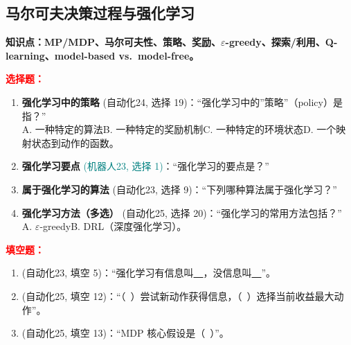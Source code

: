 ﻿\documentclass[../main.tex]{subfiles}
\begin{document}
\subsection{马尔可夫决策过程与强化学习}

\noindent\textbf{知识点：MP/MDP、马尔可夫性、策略、奖励、$\varepsilon$-greedy、探索/利用、Q-learning、model-based vs.\ model-free。}

\noindent\textbf{\textcolor{red}{选择题：}}
\begin{enumerate}[itemsep=0.45em, topsep=0.2em, leftmargin=1.5em]
    \item \textbf{强化学习中的策略} \textcolor{autoclassgreen}{(自动化24, 选择 19)}：``强化学习中的''策略''（policy）是指？''\\
    A. 一种特定的算法\quad B. 一种特定的奖励机制\quad C. 一种特定的环境状态\quad D. 一个映射状态到动作的函数。 

    \item \textbf{强化学习要点} \textcolor{teal}{(机器人23, 选择 1)}：``强化学习的要点是？''\\
     

    \item \textbf{属于强化学习的算法} \textcolor{autoclassgreen}{(自动化23, 选择 9)}：``下列哪种算法属于强化学习？''\\
     

    \item \textbf{强化学习方法（多选）} \textcolor{autoclassgreen}{(自动化25, 选择 20)}：``强化学习的常用方法包括？''\\
    A. $\varepsilon$-greedy\quad B. DRL（深度强化学习）\quad {}\quad {}。 
\end{enumerate}

\noindent\textbf{\textcolor{red}{填空题：}}
\begin{enumerate}[itemsep=0.3em, topsep=0.2em, leftmargin=1.5em]
    \item \textcolor{autoclassgreen}{(自动化23, 填空 5)}：``强化学习有信息叫\underline{\ \ }，没信息叫\underline{\ \ }''。 
    \item \textcolor{autoclassgreen}{(自动化25, 填空 12)}：``（\ ）尝试新动作获得信息，（\ ）选择当前收益最大动作''。 
    \item \textcolor{autoclassgreen}{(自动化25, 填空 13)}：``MDP 核心假设是（\ ）''。 
\end{enumerate}
\end{document}

